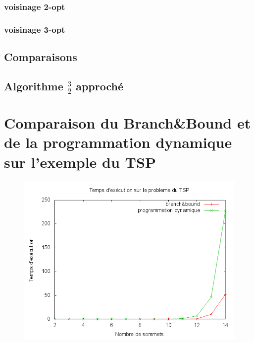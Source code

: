 \subsubsection{voisinage 2-opt}

\subsubsection{voisinage 3-opt}


\subsection{Comparaisons}


\subsection{Algorithme $\frac{3}{2}$ approché}



\section{Comparaison du Branch\&Bound et de la programmation dynamique sur l'exemple du TSP}


\begin{figure}[H]
	\includegraphics[width=\linewidth]{../pratique/comp.png}
\end{figure}


